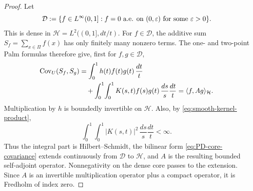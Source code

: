 \documentclass[11pt]{article}
\numberwithin{equation}{section}
\theoremstyle{definition}
\theoremstyle{remark}
\newcommand{\1}{\mathbf 1}
\begin{document}
\begin{proof}
Let
\[
 \mathcal D:=\{f\in L^\infty(0,1]:
   f=0\ \hbox{a.e. on }(0,\varepsilon)
   \hbox{ for some }\varepsilon>0\}.
\]
This is dense in \(\mathcal H=L^2((0,1],dt/t)\).  For
\(f\in\mathcal D\), the additive sum
\(S_f=\sum_{x\in\Pi}f(x)\) has only finitely many nonzero terms.
The one- and two-point Palm formulas therefore give, first for
\(f,g\in\mathcal D\),
\begin{align}
 \operatorname{Cov}_U(S_f,S_g)
 &=\int_0^1h(t)f(t)g(t)\,\frac{dt}{t}\notag\\
 &\quad+\int_0^1\!\int_0^1K(s,t)f(s)g(t)
       \,\frac{ds}{s}\frac{dt}{t}
 =\langle f,Ag\rangle_{\mathcal H}.
 \label{eq:PD-core-covariance}
\end{align}
Multiplication by \(h\) is boundedly invertible on \(\mathcal H\).  Also,
by \eqref{eq:smooth-kernel-product},
\[
 \int_0^1\!\int_0^1|K(s,t)|^2
       \,\frac{ds}{s}\frac{dt}{t}<\infty.
\]
Thus the integral part is Hilbert--Schmidt, the bilinear form
\eqref{eq:PD-core-covariance} extends continuously from
\(\mathcal D\) to \(\mathcal H\), and \(A\) is the resulting bounded
self-adjoint operator.  Nonnegativity on the dense core passes to the
extension.  Since \(A\) is an invertible multiplication operator plus a
compact operator, it is Fredholm of index zero.


\end{proof}
\end{document}

